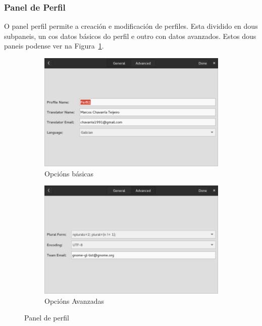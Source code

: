 \subsubsection{Panel de Perfil}
O panel perfil permite a creación e modificación de perfiles. Esta dividido en dous subpaneis, un cos datos básicos do perfil e outro con datos avanzados. Estos dous paneis podense ver na Figura~\ref{fig:ui:panel:profile}.
\begin{figure}[h!]
  \centering
  \begin{subfigure}[b]{0.5\textwidth}
    \includegraphics[width=\textwidth]{img/panel_pefil_xeral.png}
    \caption{Opcións básicas}
  \end{subfigure}
  \begin{subfigure}[b]{0.5\textwidth}
    \includegraphics[width=\textwidth]{img/panel_perfil_avanzado.png}
    \caption{Opcións Avanzadas}
  \end{subfigure}
    \caption{Panel de perfil}
    \label{fig:ui:panel:profile}
\end{figure}

